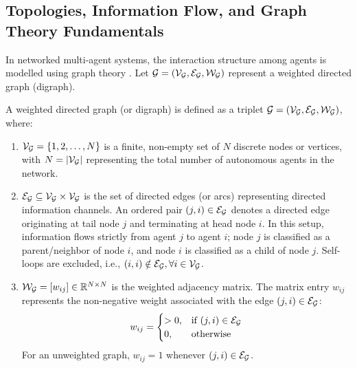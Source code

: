 \subsection{Topologies, Information Flow, and Graph Theory Fundamentals}
In networked multi-agent systems, the interaction structure among agents is modelled using graph theory \cite{godsil2001algebraic, mesbahi2010graph}. Let $\mathcal{G} = ({\mathcal{V}}_{\mathcal{G}}, {\mathcal{E}}_{\mathcal{G}}, {\mathcal{W}}_{\mathcal{G}})$ represent a weighted directed graph (digraph).
\begin{definition}\label{def:weighted_digraph}
A weighted directed graph (or digraph) is defined as a triplet $\mathcal{G} = ({\mathcal{V}}_{\mathcal{G}}, {\mathcal{E}}_{\mathcal{G}}, {\mathcal{W}}_{\mathcal{G}})$, where:
\begin{enumerate}
    \item ${\mathcal{V}}_{\mathcal{G}} = \{1, 2, \dots, N\}$ is a finite, non-empty set of $N$ discrete nodes or vertices, with $N = |{\mathcal{V}}_{\mathcal{G}}|$ representing the total number of autonomous agents in the network.
    \item ${\mathcal{E}}_{\mathcal{G}} \subseteq {\mathcal{V}}_{\mathcal{G}} \times {\mathcal{V}}_{\mathcal{G}}$ is the set of directed edges (or arcs) representing directed information channels. An ordered pair $(j, i) \in {\mathcal{E}}_{\mathcal{G}}$ denotes a directed edge originating at tail node $j$ and terminating at head node $i$. In this setup, information flows strictly from agent $j$ to agent $i$; node $j$ is classified as a parent/neighbor of node $i$, and node $i$ is classified as a child of node $j$. Self-loops are excluded, i.e., $(i, i) \notin {\mathcal{E}}_{\mathcal{G}}, \forall i \in {\mathcal{V}}_{\mathcal{G}}$.
    \item ${\mathcal{W}}_{\mathcal{G}} = [w_{ij}] \in \mathbb{R}^{N \times N}$ is the weighted adjacency matrix. The matrix entry $w_{ij}$ represents the non-negative weight associated with the edge $(j, i) \in {\mathcal{E}}_{\mathcal{G}}$:
    \begin{equation}\label{eq:adj_matrix_def}
        w_{ij} = \begin{cases}
            > 0, & \text{if } (j, i) \in {\mathcal{E}}_{\mathcal{G}} \\
            0, & \text{otherwise}
        \end{cases}
    \end{equation}
    For an unweighted graph, $w_{ij} = 1$ whenever $(j, i) \in {\mathcal{E}}_{\mathcal{G}}$.
\end{enumerate}
\end{definition}

